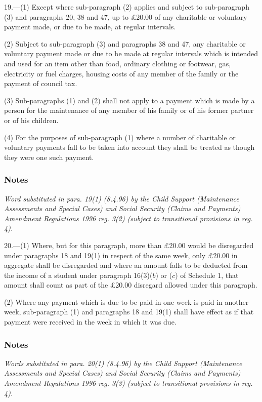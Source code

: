 \documentclass[a4paper]{article}
\newcommand\amendment[1]{\subsubsection*{Notes}{\itshape\frenchspacing\footnotesize #1 \par\goodbreak}}
\begin{document}
\medskip

19.—(1) Except where sub-paragraph (2) applies and subject to sub-\hspace{0pt}paragraph (3) and paragraphs 20, 38 and 47, 
up to £20.00  %
of any charitable or voluntary payment made, or due to be made, at regular intervals.

(2) Subject to sub-paragraph (3) and paragraphs 38 and 47, any charitable or voluntary payment made or due to be made at regular intervals which is intended and used for an item other than food, ordinary clothing or footwear, gas, electricity or fuel charges, housing costs of any member of the family or the payment of council tax.

(3) Sub-paragraphs (1) and (2) shall not apply to a payment which is made by a person for the maintenance of any member of his family or of his former partner or of his children.

(4) For the purposes of sub-paragraph (1) where a number of charitable or voluntary payments fall to be taken into account they shall be treated as though they were one such payment.

\amendment{
Word substituted in para. 19(1) (8.4.96) by the Child Support (Maintenance Assessments and Special Cases) and Social Security (Claims and Payments) Amendment Regulations 1996 reg. 3(2) (subject to transitional provisions in reg. 4).
}

\medskip

20.—(1) Where, but for this paragraph, more than 
£20.00  %
would be disregarded under paragraphs 18 and 19(1) in respect of the same week, only 
£20.00  %
in aggregate shall be disregarded and where an amount falls to be deducted from the income of a student under paragraph 16(3)($b$) or ($c$) of Schedule 1, that amount shall count as part of the 
£20.00  %
disregard allowed under this paragraph.

(2) Where any payment which is due to be paid in one week is paid in another week, sub-paragraph (1) and paragraphs 18 and 19(1) shall have effect as if that payment were received in the week in which it was due.

\amendment{
Words substituted in para. 20(1) (8.4.96) by the Child Support (Maintenance Assessments and Special Cases) and Social Security (Claims and Payments) Amendment Regulations 1996 reg. 3(3)  (subject to transitional provisions in reg. 4).
}
\end{document}

